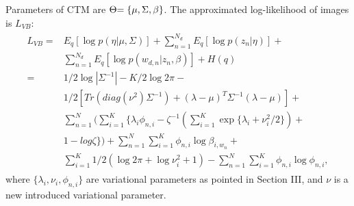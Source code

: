 \documentclass[journal]{IEEEtran}
\begin{document}
Parameters of CTM are $\Theta {\rm{ = \{ }}\mu ,\Sigma ,\beta {\rm{\} }}$. The approximated log-likelihood of images is ${L_{VB}}$:
\begin{equation} \label{Equa:appendix}
    \begin{array}{l}
    \begin{aligned}
       {L_{VB}} = & {E_q}[\log p(\eta |\mu ,\Sigma )] + \sum\limits_{n = 1}^{{N_d}} {{E_q}[\log p({z_n}|\eta )]}  + \\
                   & \sum\limits_{n = 1}^{{N_d}} {{E_q}[\log p({w_{d,n}}|{z_n},\beta )]}  + H(q)\\
                 = & 1/2\log |{\Sigma ^{ - 1}}| - K/2\log 2\pi  - \\
                   & 1/2[Tr(diag({\nu ^2}){\Sigma ^{ - 1}}) + {(\lambda  - \mu )^T}{\Sigma ^{ - 1}}(\lambda  - \mu )] + \\
                   & \sum\limits_{n = 1}^N {(\sum\limits_{i = 1}^K {\{ {\lambda _i}} {\phi _{n,i}} - {\zeta ^{ - 1}}(\sum\limits_{i = 1}^K {\exp \{ {\lambda _i} + \nu _i^2/2\} } ) + } \\
                   & 1 - log\zeta \} ) + \sum\limits_{n = 1}^N {\sum\limits_{i = 1}^K {{\phi _{n,i}}\log {\beta _{i,{w_n}}} + } } \\
                   & \sum\limits_{i = 1}^K {1/2} (\log2\pi  + \log\nu _i^2 + 1) - \sum\limits_{n = 1}^N {\sum\limits_{i = 1}^K {{\phi _{n,i}}\log } } {\phi _{n,i}},
    \end{aligned}
    \end{array}
\end{equation}
where $\{\lambda_i, \nu _i, \phi _{n,i}\}$ are variational parameters as pointed in Section III, and $\nu$ is a new introduced variational parameter.
\end{document}
